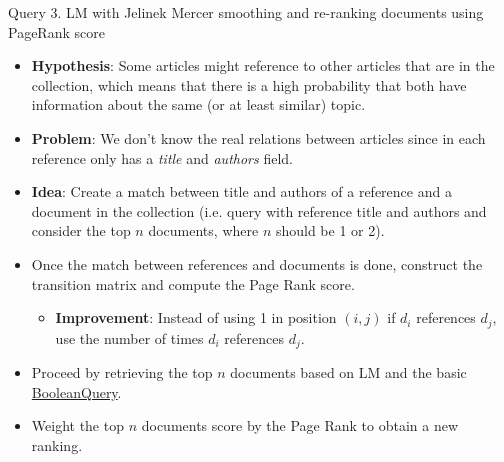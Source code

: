 \documentclass[10pt]{beamer}
\begin{document}
{\begin{frame}{Query 3. LM with Jelinek Mercer smoothing and re-ranking documents using PageRank score}
    \begin{itemize}
        \item \textbf{Hypothesis}: Some articles might reference to other articles that are in the collection, which means that there is a high probability that both have information about the same (or at least similar) topic. 
        \item \textbf{Problem}: We don't know the real relations between articles since in each reference only has a \textit{title} and \textit{authors} field.
        \item \textbf{Idea}: Create a match between title and authors of a reference and a document in the collection (i.e. query with reference title and authors and consider the top $n$ documents, where $n$ should be 1 or 2).
        \item Once the match between references and documents is done, construct the transition matrix and compute the Page Rank score.
        \begin{itemize}
            \item \textbf{Improvement}: Instead of using 1 in position $(i, j)$ if $d_i$ references $d_j$, use the number of times $d_i$ references $d_j$.
        \end{itemize}
        \item Proceed by retrieving the top $n$ documents based on LM and the basic \href{https://lucene.apache.org/core/8_9_0/core/org/apache/lucene/search/BooleanQuery.html}{BooleanQuery}.
        \item Weight the top $n$ documents score by the Page Rank to obtain a new ranking.
    \end{itemize}
\end{frame}


}
\end{document}
